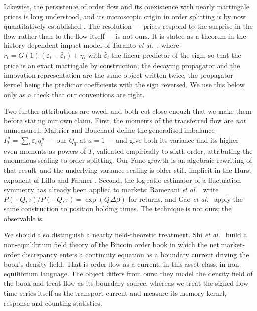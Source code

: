 \documentclass[aps,pre,twocolumn,superscriptaddress,floatfix,nofootinbib]{revtex4-2}
\newcommand{\eps}{\varepsilon}
\begin{document}
Likewise, the persistence of order flow and its coexistence with nearly
martingale prices is long understood, and its microscopic origin in order
splitting is by now quantitatively established
\cite{lillo2005,sato2023prl,sato2023prr}. The resolution --- prices respond to
the surprise in the flow rather than to the flow itself --- is not ours. It is
stated as a theorem in the history-dependent impact model of Taranto
\textit{et al.}\ \cite{taranto2016}, where $r_t = G(1)\,(\eps_t-\hat\eps_t) +
\eta_t$ with $\hat\eps_t$ the linear predictor of the sign, so that the price
is an exact martingale by construction; the decaying propagator and the
innovation representation are the same object written twice, the propagator
kernel being the predictor coefficients with the sign reversed. We use this
below only as a check that our conventions are right.

Two further attributions are owed, and both cut close enough that we make them
before stating our own claim. First, the moments of the transferred flow are
\emph{not} unmeasured. Maitrier and Bouchaud \cite{maitrier2026} define the
generalised imbalance $I_T^{\,a} = \sum_t \eps_t\, q_t^{\,a}$ --- our $Q_T$ at
$a=1$ --- and give both its variance and its higher even moments as powers of
$T$, validated empirically to sixth order, attributing the anomalous scaling to
order splitting. Our Fano growth is an algebraic rewriting of that result, and
the underlying variance scaling is older still, implicit in the Hurst exponent
of Lillo and Farmer \cite{lillo2004}. Second, the log-ratio estimator of a
fluctuation symmetry has already been applied to markets: Ramezani
\textit{et al.}\ \cite{ramezani2025} write $P(+Q,\tau)/P(-Q,\tau) =
\exp(Q\,\Delta\beta)$ for returns, and Gao \textit{et al.}\ \cite{gao2026}
apply the same construction to position holding times. The technique is not
ours; the observable is.

We should also distinguish a nearby field-theoretic treatment. Shi
\textit{et al.}\ \cite{shi2021} build a non-equilibrium field theory of the
Bitcoin order book in which the net market-order discrepancy enters a
continuity equation as a boundary current driving the book's density field.
That is order flow as a current, in this asset class, in non-equilibrium
language. The object differs from ours: they model the density field of the
book and treat flow as its boundary source, whereas we treat the signed-flow
time series itself as the transport current and measure its memory kernel,
response and counting statistics.
\end{document}
